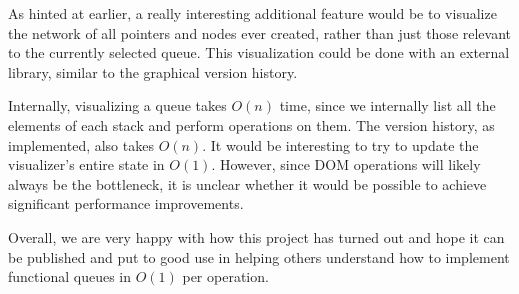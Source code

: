\documentclass[runningheads]{llncs}
\begin{document}
As hinted at earlier, a really interesting additional feature would be to visualize the network of all pointers and nodes ever created, rather than just those relevant to the currently selected queue. This visualization could be done with an external library, similar to the graphical version history.

Internally, visualizing a queue takes $O(n)$ time, since we internally list all the elements of each stack and perform operations on them. The version history, as implemented, also takes $O(n)$. It would be interesting to try to update the visualizer's entire state in $O(1)$. However, since DOM operations will likely always be the bottleneck, it is unclear whether it would be possible to achieve significant performance improvements.

Overall, we are very happy with how this project has turned out and hope it can be published and put to good use in helping others understand how to implement functional queues in $O(1)$ per operation.






\end{document}
